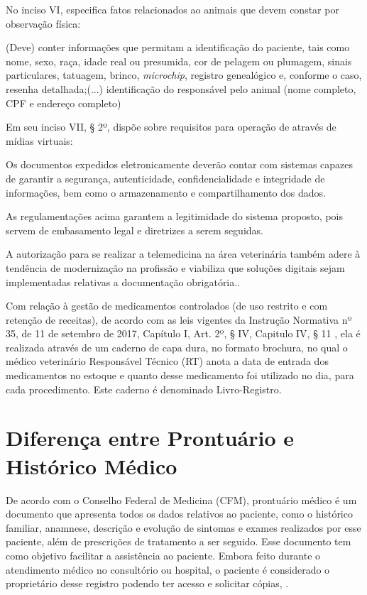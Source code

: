 \documentclass[
    12pt,               %
    openright,          %
    oneside,
    a4paper,            %
    BIBLATEX,           %
    TODO,               %
    english,            %
    brazil              %
    ]{ifsp-spo-inf-ctds}
\begin{document}
            No inciso VI, especifica fatos relacionados ao animais que devem constar por observação física:

        \begin{citacao}

            (Deve) conter informações que permitam a identificação do paciente, tais como nome, sexo, raça, idade real ou presumida, cor de pelagem ou plumagem, sinais particulares, tatuagem, brinco, \emph{microchip}, registro genealógico e, conforme o caso, resenha detalhada;(...) identificação do responsável pelo animal (nome completo, CPF e endereço completo)
        \end{citacao}

        Em seu inciso VII, § 2º, dispõe sobre requisitos para operação de através de mídias virtuais: 

        \begin{citacao}
            Os documentos expedidos eletronicamente deverão contar com sistemas capazes de garantir a segurança, autenticidade, confidencialidade e integridade de informações, bem como o armazenamento e compartilhamento dos dados.
        \end{citacao}

           As regulamentações acima garantem a legitimidade do sistema proposto, pois servem de embasamento legal e diretrizes a serem seguidas.

        A autorização para se realizar a telemedicina na área veterinária também adere à tendência de modernização na profissão e viabiliza que soluções digitais sejam implementadas relativas a documentação obrigatória..

        Com relação à gestão de medicamentos controlados (de uso restrito e com retenção de receitas), de acordo com as leis vigentes da Instrução Normativa nº 35, de 11 de setembro de 2017, Capítulo I, Art. 2º, § IV, Capitulo IV, § 11  , ela é realizada através de um caderno de capa dura, no formato brochura, no qual o médico veterinário Responsável Técnico (RT) anota a data de entrada dos medicamentos no estoque e quanto desse medicamento foi utilizado no dia, para cada procedimento. Este caderno é denominado Livro-Registro.

    \section{Diferença entre Prontuário e Histórico Médico }

    De acordo com o Conselho Federal de Medicina (CFM), prontuário médico é um documento que apresenta todos os dados relativos ao paciente, como o histórico familiar, anamnese, descrição e evolução de sintomas e exames realizados por esse paciente, além de prescrições de tratamento a ser seguido. Esse documento tem como objetivo facilitar a assistência ao paciente. Embora feito durante o atendimento médico no consultório ou hospital, o paciente é considerado o proprietário desse registro podendo ter acesso e solicitar cópias, .
\end{document}
